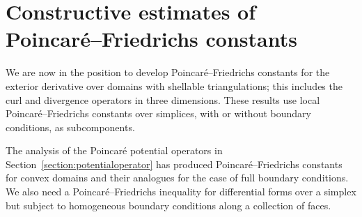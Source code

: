 \documentclass[10pt,a4paper]{article}
\begin{document}
\color{black}




























        
        
        
        
        
        
        
        








\section{Constructive estimates of Poincar\'e--Friedrichs constants}\label{section:poincarefriedrichs}

We are now in the position to develop Poincar\'e--Friedrichs constants for the exterior derivative over domains with shellable triangulations; this includes the curl and divergence operators in three dimensions. 
These results use local Poincar\'e--Friedrichs constants over simplices, 
with or without boundary conditions, as subcomponents. 

The analysis of the Poincar\'e potential operators in Section~\ref{section:potentialoperator} has produced Poincar\'e--Friedrichs constants for convex domains and their analogues for the case of full boundary conditions. 
We also need a Poincar\'e--Friedrichs inequality for differential forms over a simplex but subject to homogeneous boundary conditions along a collection of faces. 
\end{document}
